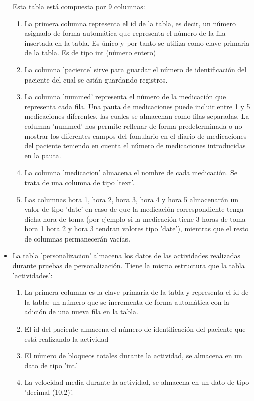 \begin{itemize}
    Esta tabla está compuesta por 9 columnas:
    \begin{enumerate}
        \item La primera columna representa el id de la tabla, es decir, un número asignado de forma automática que representa el número de la fila insertada en la tabla. Es único y por tanto se utiliza como clave primaria de la tabla. Es de tipo int (número entero)
        \item La columna 'paciente' sirve para guardar el número de identificación del paciente del cual se están guardando registros.
        \item La columna 'nummed' representa el número de la medicación que representa cada fila. Una pauta de medicaciones puede incluir entre 1 y 5 medicaciones diferentes, las cuales se almacenan como filas separadas. La columna 'nummed' nos permite rellenar de forma predeterminada o no mostrar los diferentes campos del fomulario en el diario de medicaciones del paciente teniendo en cuenta el número de medicaciones introducidas en la pauta. 
        \item La columna 'medicacion' almacena el nombre de cada medicación. Se trata de una columna de tipo 'text'.
        \item Las columnas hora 1, hora 2, hora 3, hora 4 y hora 5 almacenarán un valor de tipo 'date' en caso de que la medicación correspondiente tenga dicha hora de toma (por ejemplo si la medicación tiene 3 horas de toma hora 1 hora 2 y hora 3 tendran valores tipo 'date'), mientras que el resto de columnas permanecerán vacías.
    \end{enumerate}
    \item La tabla 'personalizacion' almacena los datos de las actividades realizadas durante pruebas de personalización. Tiene la misma estructura que la tabla 'actividades':
    \begin{enumerate}
        \item La primera columna es la clave primaria de la tabla y representa el id de la tabla: un número que se incrementa de forma automática con la adición de una nueva fila en la tabla.
        \item El id del paciente almacena el número de identificación del paciente que está realizando la actividad
        \item El número de bloqueos totales durante la actividad, se almacena en un dato de tipo 'int.'
        \item La velocidad media durante la actividad, se almacena en un dato de tipo 'decimal (10,2)'.

\end{enumerate}
\end{itemize}
